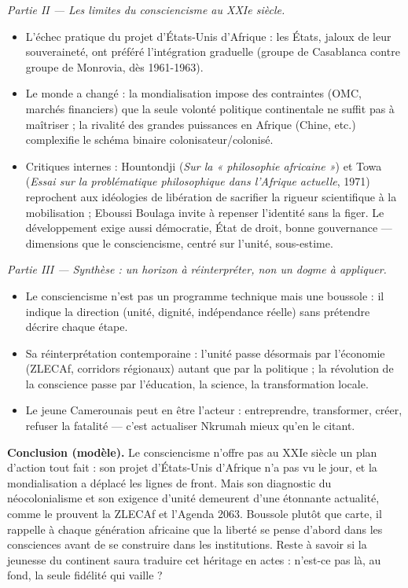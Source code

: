 \documentclass[11pt]{article}
\begin{document}
\begin{corrige}
\emph{Partie II — Les limites du consciencisme au XXIe siècle.}
\begin{itemize}
\item L'échec pratique du projet d'États-Unis d'Afrique : les États, jaloux de leur souveraineté, ont préféré l'intégration graduelle (groupe de Casablanca contre groupe de Monrovia, dès 1961-1963).
\item Le monde a changé : la mondialisation impose des contraintes (OMC, marchés financiers) que la seule volonté politique continentale ne suffit pas à maîtriser ; la rivalité des grandes puissances en Afrique (Chine, etc.) complexifie le schéma binaire colonisateur/colonisé.
\item Critiques internes : Hountondji (\emph{Sur la « philosophie africaine »}) et Towa (\emph{Essai sur la problématique philosophique dans l'Afrique actuelle}, 1971) reprochent aux idéologies de libération de sacrifier la rigueur scientifique à la mobilisation ; Eboussi Boulaga invite à repenser l'identité sans la figer. Le développement exige aussi démocratie, État de droit, bonne gouvernance — dimensions que le consciencisme, centré sur l'unité, sous-estime.
\end{itemize}

\emph{Partie III — Synthèse : un horizon à réinterpréter, non un dogme à appliquer.}
\begin{itemize}
\item Le consciencisme n'est pas un programme technique mais une boussole : il indique la direction (unité, dignité, indépendance réelle) sans prétendre décrire chaque étape.
\item Sa réinterprétation contemporaine : l'unité passe désormais par l'économie (ZLECAf, corridors régionaux) autant que par la politique ; la révolution de la conscience passe par l'éducation, la science, la transformation locale.
\item Le jeune Camerounais peut en être l'acteur : entreprendre, transformer, créer, refuser la fatalité — c'est actualiser Nkrumah mieux qu'en le citant.
\end{itemize}

\textbf{Conclusion (modèle).} Le consciencisme n'offre pas au XXIe siècle un plan d'action tout fait : son projet d'États-Unis d'Afrique n'a pas vu le jour, et la mondialisation a déplacé les lignes de front. Mais son diagnostic du néocolonialisme et son exigence d'unité demeurent d'une étonnante actualité, comme le prouvent la ZLECAf et l'Agenda 2063. Boussole plutôt que carte, il rappelle à chaque génération africaine que la liberté se pense d'abord dans les consciences avant de se construire dans les institutions. Reste à savoir si la jeunesse du continent saura traduire cet héritage en actes : n'est-ce pas là, au fond, la seule fidélité qui vaille ?


\end{corrige}
\end{document}

